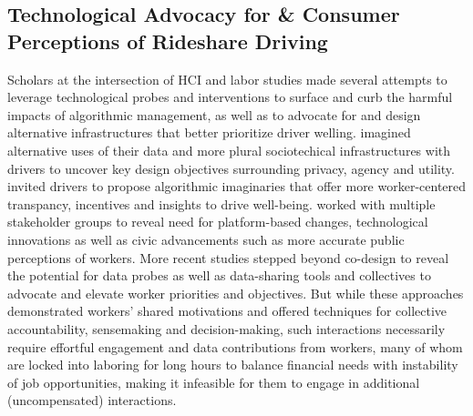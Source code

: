 \subsection{Technological Advocacy for \& Consumer Perceptions of Rideshare Driving} \label{advocacy_background}
Scholars at the intersection of HCI and labor studies made several attempts to leverage technological probes and interventions to surface and curb the harmful impacts of algorithmic management, as well as to advocate for and design alternative infrastructures that better prioritize driver welling.  \citet{stein2023you} imagined alternative uses of their data and more plural sociotechical infrastructures with drivers to uncover key design objectives surrounding privacy, agency and utility. \citet{zhang2023stakeholder} invited drivers to propose algorithmic imaginaries that offer more worker-centered transpancy, incentives and insights to drive well-being. \citet{alternative} worked with multiple stakeholder groups to reveal need for platform-based changes, technological innovations as well as civic advancements such as more accurate public perceptions of workers. More recent studies stepped beyond co-design to reveal the potential for data probes \cite{zhang2023stakeholder} as well as data-sharing tools \cite{gig2gether, fairfare, bargaining} and collectives \cite{workshop} to advocate and elevate worker priorities and objectives.
But while these approaches demonstrated workers' shared motivations and offered techniques for collective accountability, sensemaking and decision-making, such interactions necessarily require effortful engagement and data contributions from workers, many of whom are locked into laboring for long hours to balance financial needs \cite{good} with instability of job opportunities, making it infeasible for them to engage in additional (uncompensated) interactions. 

